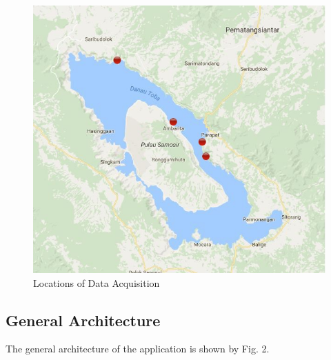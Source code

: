 \documentclass[journal,comsoc]{IEEEtran}
\let\MYoriglatexcaption\caption
\renewcommand{\caption}[2][\relax]{\MYoriglatexcaption[#2]{#2}}
\begin{document}
\begin{figure}[!th]
\centering
\includegraphics[scale=0.2]{map_data_acquisition.jpg}
\caption{Locations of Data Acquisition \cite{Rahmat16}}
\label{fig1}
\end{figure}

\subsection{General Architecture}

The general architecture of the application is shown by Fig. 2.
\end{document}
